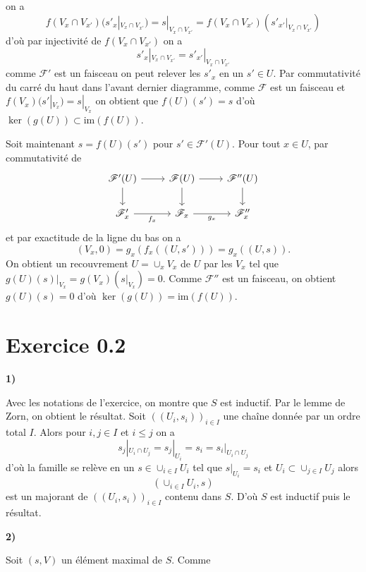 \documentclass[a4paper,12pt]{article}
\newcommand{\F}{\mathscr F}
\newcommand{\im}{\textrm{im}}
\theoremstyle{plain}
\theoremstyle{definition}
\theoremstyle{remark}
\begin{document}
on a 
\[f(V_x\cap V_{x'})(s'_x|_{V_x\cap V_{x'}})=s|_{V_x\cap V_{x'}}=
f(V_x\cap V_{x'})(s'_{x'}|_{V_x\cap V_{x'}})\]
d'où par injectivité de $f(V_x\cap V_{x'})$ on a 
\[s'_x|_{V_x\cap V_{x'}}=s'_{x'}|_{V_x\cap V_{x'}}\]
comme $\F'$ est un faisceau on peut relever les $s'_x$ en un $s'\in U$.
Par commutativité du carré du haut dans l'avant dernier diagramme, comme
$\F$ est un faisceau et $f(V_x)(s'|_{V_x})=s|_{V_x}$ on obtient que
$f(U)(s')=s$ d'où $\ker(g(U))\subset \im(f(U))$. 

Soit maintenant $s=f(U)(s')$ pour $s'\in \F'(U)$. Pour tout $x\in U$,
par commutativité de 
\[\begin{tikzcd}
	{\F'(U)} & {\F(U)} & {\F''(U)} \\
	{\F'_x} & {\F_x} & {\F''_x}
	\arrow[from=1-1, to=1-2]
	\arrow[from=1-1, to=2-1]
	\arrow[from=1-2, to=1-3]
	\arrow[from=1-2, to=2-2]
	\arrow[from=1-3, to=2-3]
	\arrow["{f_x}"', from=2-1, to=2-2]
	\arrow["{g_x}"', from=2-2, to=2-3]
\end{tikzcd}\]
et par exactitude de la ligne du bas on a 
\[(V_x,0)=g_x(f_x((U,s')))=g_x((U,s)).\]
On obtient un recouvrement 
$U=\cup_x V_x$ de $U$ par les $V_x$ tel que 
$g(U)(s)|_{V_x}=g(V_x)(s|_{V_x})=0$.
Comme $\F''$ est un faisceau, on obtient $g(U)(s)=0$ d'où 
$\ker(g(U))=\im(f(U))$.

\section*{Exercice 0.2}
\begin{center}
	\textbf{1)}
\end{center}
Avec les notations de l'exercice, on montre que $S$ est inductif. 
Par le lemme de Zorn, on obtient le résultat. Soit 
$((U_i, s_i))_{i\in I}$ une chaîne donnée par un ordre total $I$. Alors
pour $i,j\in I$ et $i\leq j$ on a 
\[s_j|_{U_i\cap U_j}=s_j|_{U_i}=s_i=s_i|_{U_i\cap U_j}\]
d'où la famille se relève en un $s\in \cup_{i\in I} U_i$ tel que 
$s|_{U_i}=s_i$ et $U_i\subset \cup_{j\in I}U_j$ alors 
\[(\cup_{i\in I} U_i, s)\]
est un majorant de $((U_i,s_i))_{i\in I}$ contenu dans $S$. D'où
$S$ est inductif puis le résultat.
\begin{center}
	\textbf{2)}
\end{center}
Soit $(s, V)$ un élément maximal de $S$. Comme 
\end{document}
